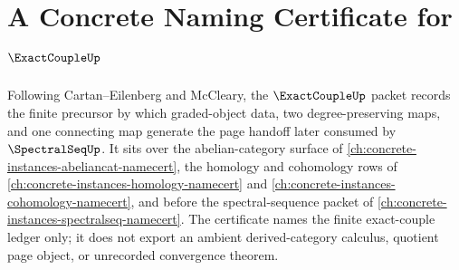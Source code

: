 \chapter{A Concrete Naming Certificate for $\ExactCoupleUp$}
\label{ch:concrete-instances-exact-couple-namecert}

Following Cartan--Eilenberg and McCleary, the $\ExactCoupleUp$ packet records the finite precursor by which graded-object data, two degree-preserving maps, and one connecting map generate the page handoff later consumed by $\SpectralSeqUp$. It sits over the abelian-category surface of \autoref{ch:concrete-instances-abeliancat-namecert}, the homology and cohomology rows of \autoref{ch:concrete-instances-homology-namecert} and \autoref{ch:concrete-instances-cohomology-namecert}, and before the spectral-sequence packet of \autoref{ch:concrete-instances-spectralseq-namecert}. The certificate names the finite exact-couple ledger only; it does not export an ambient derived-category calculus, quotient page object, or unrecorded convergence theorem.

